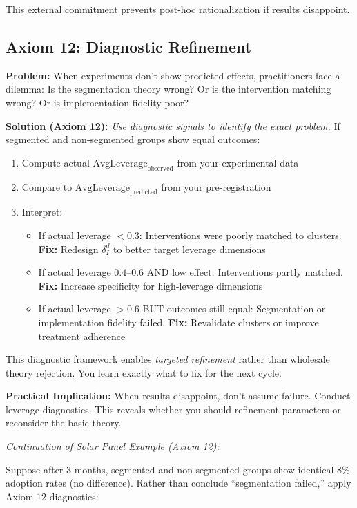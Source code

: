 This external commitment prevents post-hoc rationalization if results disappoint.

\subsection{Axiom 12: Diagnostic Refinement}

\textbf{Problem:} When experiments don't show predicted effects, practitioners face a dilemma: Is the segmentation theory wrong? Or is the intervention matching wrong? Or is implementation fidelity poor?

\textbf{Solution (Axiom 12):} \emph{Use diagnostic signals to identify the exact problem.} If segmented and non-segmented groups show equal outcomes:

\begin{enumerate}[nosep]
\item Compute actual $\text{AvgLeverage}_{\text{observed}}$ from your experimental data
\item Compare to $\text{AvgLeverage}_{\text{predicted}}$ from your pre-registration
\item Interpret:
\begin{itemize}[nosep]
\item If actual leverage $< 0.3$: Interventions were poorly matched to clusters. \textbf{Fix:} Redesign $\delta_I^d$ to better target leverage dimensions
\item If actual leverage $0.4$--$0.6$ AND low effect: Interventions partly matched. \textbf{Fix:} Increase specificity for high-leverage dimensions
\item If actual leverage $> 0.6$ BUT outcomes still equal: Segmentation or implementation fidelity failed. \textbf{Fix:} Revalidate clusters or improve treatment adherence
\end{itemize}
\end{enumerate}

This diagnostic framework enables \emph{targeted refinement} rather than wholesale theory rejection. You learn exactly what to fix for the next cycle. \cite{button2013power, bland1995multiple, camerer2018evaluatingevaluating}

\textbf{Practical Implication:} When results disappoint, don't assume failure. Conduct leverage diagnostics. This reveals whether you should refinement parameters or reconsider the basic theory.

\textit{Continuation of Solar Panel Example (Axiom 12):}

Suppose after 3 months, segmented and non-segmented groups show identical 8\% adoption rates (no difference). Rather than conclude ``segmentation failed,'' apply Axiom 12 diagnostics:

